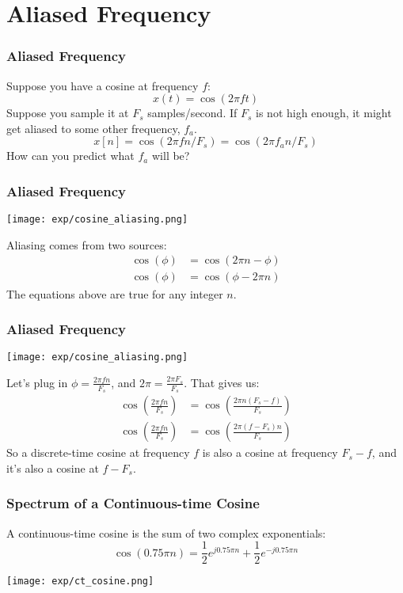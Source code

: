 \documentclass{beamer}
\begin{document}
\section[Aliased Frequency]{Aliased Frequency}
\setcounter{subsection}{1}

\begin{frame}
  \frametitle{Aliased Frequency}

  Suppose you have a cosine at frequency $f$:
  \[
  x(t) = \cos(2\pi ft)
  \]
  Suppose you sample it at $F_s$ samples/second.  If $F_s$ is not high
  enough, it might get aliased to some other frequency, $f_a$.
  \[
  x[n] = \cos(2\pi f n/F_s) = \cos(2\pi f_a n/F_s)
  \]
  How can you predict what $f_a$ will be?
\end{frame}

\begin{frame}
  \frametitle{Aliased Frequency}

  \centerline{\texttt{[image: exp/cosine\_aliasing.png]}}
  Aliasing comes from two sources:
  \begin{align*}
    \cos(\phi) &= \cos(2\pi n -\phi)\\
    \cos(\phi) &= \cos(\phi-2\pi n)
  \end{align*}
  The equations above are true for any integer $n$.
\end{frame}


\begin{frame}
  \frametitle{Aliased Frequency}

  \centerline{\texttt{[image: exp/cosine\_aliasing.png]}}
  Let's plug in $\phi=\frac{2\pi fn}{F_s}$, and $2\pi = \frac{2\pi
    F_s}{F_s}$.  That gives us:
  \begin{align*}
    \cos\left(\frac{2\pi fn}{F_s}\right) &= \cos\left(\frac{2\pi n(F_s-f)}{F_s}\right)\\
    \cos\left(\frac{2\pi fn}{F_s}\right) &= \cos\left(\frac{2\pi (f-F_s)n}{F_s}\right)
  \end{align*}
  So a discrete-time cosine at frequency $f$ is also a cosine at
  frequency $F_s-f$, and it's also a cosine at $f-F_s$.
\end{frame}

\begin{frame}
  \frametitle{Spectrum of a Continuous-time Cosine}

  A continuous-time cosine is the sum of two complex exponentials:
  \begin{displaymath}
    \cos(0.75\pi n)=\frac{1}{2}e^{j0.75\pi n}+\frac{1}{2}e^{-j0.75\pi n}
  \end{displaymath}
  \centerline{\texttt{[image: exp/ct\_cosine.png]}}
\end{frame}
\end{document}
